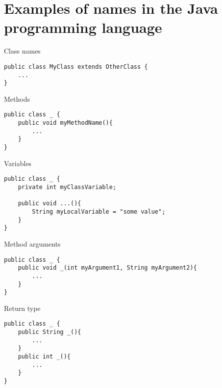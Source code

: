 \section{Examples of names in the Java programming language}
\label{appendix:java-nameabe-examples}

\begin{listing}
\caption{Class names}
\label{lst:example-class-names}
\begin{verbatim}
public class MyClass extends OtherClass {
	...
}
\end{verbatim}
\end{listing}

\begin{listing}
\caption{Methods}
\label{lst:example-methods}
\begin{verbatim}
public class _ {
	public void myMethodName(){
		...
	}
}
\end{verbatim}
\end{listing}

\begin{listing}
\caption{Variables}
\label{lst:example-variables}
\begin{verbatim}
public class _ {
	private int myClassVariable;
	
	public void ...(){
		String myLocalVariable = "some value";
	}
}
\end{verbatim}
\end{listing}

\begin{listing}
\caption{Method arguments}
\label{lst:example-method-arguments}
\begin{verbatim}
public class _ {
	public void _(int myArgument1, String myArgument2){
		...
	}
}
\end{verbatim}
\end{listing}

\begin{listing}
\caption{Return type}
\label{lst:example-return-types}
\begin{verbatim}
public class _ {
	public String _(){
		...
	}
	public int _(){
		...
	}
}
\end{verbatim}
\end{listing}